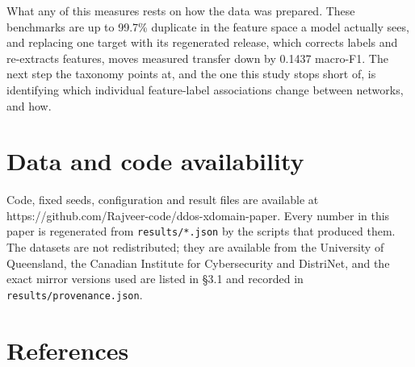 \documentclass[11pt,a4paper]{article}
\begin{document}
What any of this measures rests on how the data was prepared. These benchmarks are up to 99.7\% duplicate in the feature space a model actually sees, and replacing one target with its regenerated release, which corrects labels and re-extracts features, moves measured transfer down by 0.1437 macro-F1. The next step the taxonomy points at, and the one this study stops short of, is identifying which individual feature-label associations change between networks, and how.


\section*{Data and code availability}

Code, fixed seeds, configuration and result files are available at https://github.com/Rajveer-code/ddos-xdomain-paper. Every number in this paper is regenerated from \texttt{results/*.json} by the scripts that produced them. The datasets are not redistributed; they are available from the University of Queensland, the Canadian Institute for Cybersecurity and DistriNet, and the exact mirror versions used are listed in §3.1 and recorded in \texttt{results/provenance.json}.

\section*{References}
\end{document}
